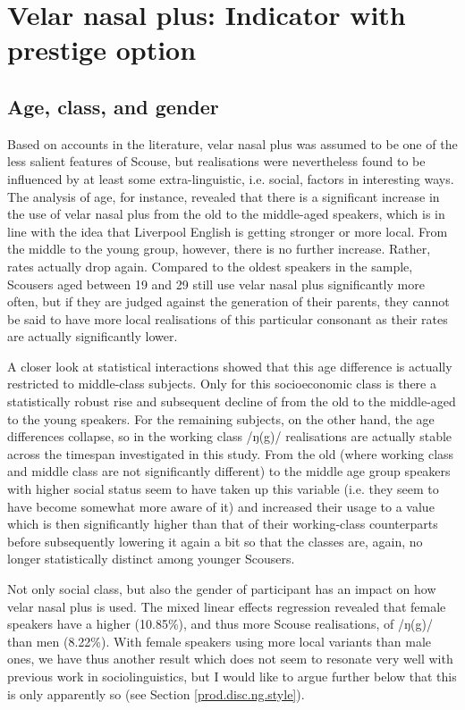 \section{Velar nasal plus: Indicator with prestige option}
\label{prod.disc.ng}

\subsection{Age, class, and gender}
\label{prod.disc.ng.social}

Based on accounts in the literature, velar nasal plus was assumed to be one of the less salient features of Scouse, but realisations were nevertheless found to be influenced by at least some extra-linguistic, i.e. social, factors in interesting ways.
The analysis of age, for instance, revealed that there is a significant increase in the use of velar nasal plus from the old to the middle-aged speakers, which is in line with the idea that Liverpool English is getting stronger or more local.
From the middle to the young group, however, there is no further increase.
Rather,  rates actually drop again.
Compared to the oldest speakers in the sample, Scousers aged between 19 and 29 still use velar nasal plus significantly more often, but if they are judged against the generation of their parents, they cannot be said to have more local realisations of this particular consonant as their rates are actually significantly lower.

A closer look at statistical interactions showed that this age difference is actually restricted to middle-class subjects.
Only for this socioeconomic class is there a statistically robust rise and subsequent decline of  from the old to the middle-aged to the young speakers.
For the remaining subjects, on the other hand, the age differences collapse, so in the working class /ŋ(g)/ realisations are actually stable across the timespan investigated in this study.
From the old (where working class and middle class are not significantly different) to the middle age group speakers with higher social status seem to have taken up this variable (i.e. they seem to have become somewhat more aware of it) and increased their usage to a value which is then significantly higher than that of their working-class counterparts before subsequently lowering it again a bit so that the classes are, again, no longer statistically distinct among younger Scousers.

Not only social class, but also the gender of participant has an impact on how velar nasal plus is used.
The mixed linear effects regression revealed that female speakers have a higher  (10.85\%), and thus more Scouse realisations, of /ŋ(g)/ than men (8.22\%).
With female speakers using more local variants than male ones, we have thus another result which does not seem to resonate very well with previous work in sociolinguistics, but I would like to argue further below that this is only apparently so (see Section \ref{prod.disc.ng.style}).

